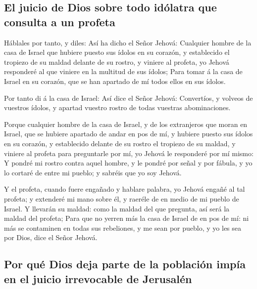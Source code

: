 \hypertarget{el-juicio-de-dios-sobre-todo-iduxf3latra-que-consulta-a-un-profeta}{%
\subsection{El juicio de Dios sobre todo idólatra que consulta a un
profeta}\label{el-juicio-de-dios-sobre-todo-iduxf3latra-que-consulta-a-un-profeta}}

 Háblales por tanto, y diles: Así ha dicho el Señor
Jehová: Cualquier hombre de la casa de Israel que hubiere puesto sus
ídolos en su corazón, y establecido el tropiezo de su maldad delante de
su rostro, y viniere al profeta, yo Jehová responderé al que viniere en
la multitud de sus ídolos;  Para tomar á la casa de Israel
en su corazón, que se han apartado de mí todos ellos en sus ídolos.

 Por tanto di á la casa de Israel: Así dice el Señor
Jehová: Convertíos, y volveos de vuestros ídolos, y apartad vuestro
rostro de todas vuestras abominaciones.

 Porque cualquier hombre de la casa de Israel, y de los
extranjeros que moran en Israel, que se hubiere apartado de andar en pos
de mí, y hubiere puesto sus ídolos en su corazón, y establecido delante
de su rostro el tropiezo de su maldad, y viniere al profeta para
preguntarle por mí, yo Jehová le responderé por mí mismo: 
Y pondré mi rostro contra aquel hombre, y le pondré por señal y por
fábula, y yo lo cortaré de entre mi pueblo; y sabréis que yo soy Jehová.

 Y el profeta, cuando fuere engañado y hablare palabra, yo
Jehová engañé al tal profeta; y extenderé mi mano sobre él, y raeréle de
en medio de mi pueblo de Israel.  Y llevarán su maldad:
como la maldad del que pregunta, así será la maldad del profeta;
 Para que no yerren más la casa de Israel de en pos de
mí: ni más se contaminen en todas sus rebeliones, y me sean por pueblo,
y yo les sea por Dios, dice el Señor Jehová.

\hypertarget{por-quuxe9-dios-deja-parte-de-la-poblaciuxf3n-impuxeda-en-el-juicio-irrevocable-de-jerusaluxe9n}{%
\subsection{Por qué Dios deja parte de la población impía en el juicio
irrevocable de
Jerusalén}\label{por-quuxe9-dios-deja-parte-de-la-poblaciuxf3n-impuxeda-en-el-juicio-irrevocable-de-jerusaluxe9n}}


